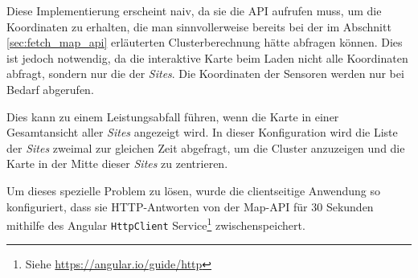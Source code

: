 Diese Implementierung erscheint naiv, da sie die \ac{API} aufrufen muss, um die Koordinaten zu erhalten, die man sinnvollerweise bereits bei der im Abschnitt \ref{sec:fetch_map_api} erläuterten Clusterberechnung hätte abfragen können.
Dies ist jedoch notwendig, da die interaktive Karte beim Laden nicht alle Koordinaten abfragt, sondern nur die der \textit{Sites}.
Die Koordinaten der Sensoren werden nur bei Bedarf abgerufen.

Dies kann zu einem Leistungsabfall führen, wenn die Karte in einer Gesamtansicht aller \textit{Sites} angezeigt wird.
In dieser Konfiguration wird die Liste der \textit{Sites} zweimal zur gleichen Zeit abgefragt, um die Cluster anzuzeigen und die Karte in der Mitte dieser \textit{Sites} zu zentrieren.

Um dieses spezielle Problem zu lösen, wurde die clientseitige Anwendung so konfiguriert, dass sie \ac{HTTP}-Antworten von der Map-\ac{API} für 30 Sekunden mithilfe des Angular \lstinline{HttpClient} Service\footnote{Siehe \href{https://angular.io/guide/http}{https://angular.io/guide/http}} zwischenspeichert.
